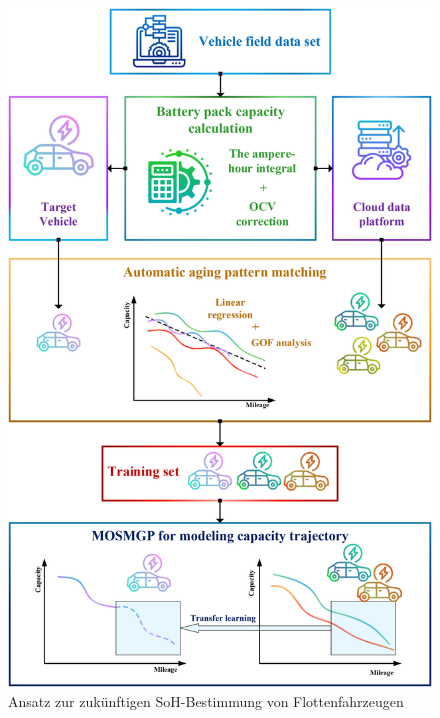 \begin{figure}[H]
	\centering
	\includegraphics[height=1.0\linewidth]{resources/images/nn-vehicle-fleet-data}
	\caption{Ansatz zur zukünftigen \acs{SoH}-Bestimmung von Flottenfahrzeugen \cite{nnVehicleFleetData}}
	\label{fig:nn-vehicle-fleet-data}
\end{figure}